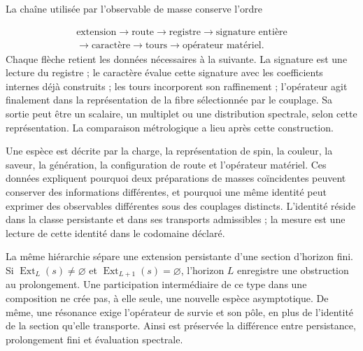 La chaîne utilisée par l’observable de masse conserve l’ordre

\begin{equation}
 \begin{gathered}
 \text{extension}\longrightarrow\text{route}\longrightarrow
 \text{registre}\longrightarrow\text{signature entière}\\
 \longrightarrow\text{caractère}\longrightarrow\text{tours}\longrightarrow
 \text{opérateur matériel}.
 \end{gathered}
 \label{vi:eq:cadena-material}
\end{equation}
Chaque flèche retient les données nécessaires à la suivante. La signature est
une lecture du registre ; le caractère évalue cette signature avec les
coefficients internes déjà construits ; les tours incorporent son
raffinement ; l’opérateur agit finalement dans la représentation de la
fibre sélectionnée par le couplage. Sa sortie peut être un scalaire,
un multiplet ou une distribution spectrale, selon cette représentation.
La comparaison métrologique a lieu après cette construction.


Une espèce est décrite par la charge, la représentation de spin, la couleur,
la saveur, la génération, la configuration de route et l’opérateur matériel. Ces données
expliquent pourquoi deux préparations de masses coïncidentes peuvent
conserver des informations différentes, et pourquoi une même identité peut
exprimer des observables différentes sous des couplages distincts. L’identité
réside dans la classe persistante et dans ses transports admissibles ;
la mesure est une lecture de cette identité dans le codomaine déclaré.


La même hiérarchie sépare une extension persistante d’une section
d’horizon fini. Si $\operatorname{Ext}_L(s)\ne\varnothing$ et
$\operatorname{Ext}_{L+1}(s)=\varnothing$, l’horizon $L$ enregistre
une obstruction au prolongement. Une participation intermédiaire de ce
type dans une composition ne crée pas, à elle seule, une nouvelle espèce
asymptotique. De même, une résonance exige l’opérateur de
survie et son pôle, en plus de l’identité de la section qu’elle
transporte. Ainsi est préservée la différence entre persistance,
prolongement fini et évaluation spectrale.
